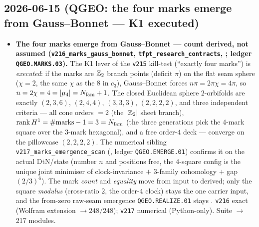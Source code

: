 \subsection*{2026-06-15 (QGEO: the four marks emerge from Gauss--Bonnet --- K1 executed)}
\begin{itemize}
\item \textbf{The four marks emerge from Gauss--Bonnet --- count derived, not assumed
  (\texttt{v216\_marks\_gauss\_bonnet}, \texttt{tfpt\_research\_contracts}, \mE; ledger \texttt{QGEO.MARKS.03}).}
  The K1 lever of the \texttt{v215} kill-test (``exactly four marks'') is
  \emph{executed}: if the marks are $\mathbb{Z}_2$ branch points (deficit $\pi$) on the flat seam sphere ($\chi=2$,
  the same $\chi$ as the $8$ in $c_3$), Gauss--Bonnet forces $n\pi=2\pi\chi=4\pi$, so
  $n=2\chi=4=|\mu_4|=N_{\mathrm{fam}}+1$. The closed Euclidean sphere $2$-orbifolds are exactly
  $(2,3,6)$, $(2,4,4)$, $(3,3,3)$, $(2,2,2,2)$, and three independent criteria --- all cone orders $=2$ (the $|\mathbb{Z}_2|$
  sheet branch), $\mathrm{rank}\,H^1=\#\text{marks}-1=3=N_{\mathrm{fam}}$ (the three generations pick the $4$-mark square
  over the $3$-mark hexagonal), and a free order-$4$ deck --- converge on the pillowcase $(2,2,2,2)$. The
  numerical sibling \texttt{v217\_marks\_emergence\_scan} (\mC, ledger \texttt{QGEO.EMERGE.01}) confirms it on
  the actual DtN/state (number $n$ and positions free, the $4$-square config is the unique joint minimiser of
  clock-invariance $+$ $3$-family cohomology $+$ gap $(2/3)^6$). The mark \emph{count} and \emph{equality}
  move from input to derived; only the square
  \emph{modulus} (cross-ratio $2$, the order-$4$ clock) stays the one carrier input, and the from-zero
  raw-seam emergence \texttt{QGEO.REALIZE.01} stays \mO. \texttt{v216} exact (Wolfram extension
  $\to248/248$); \texttt{v217} numerical (Python-only). Suite $\to$ 217 modules.
\end{itemize}

